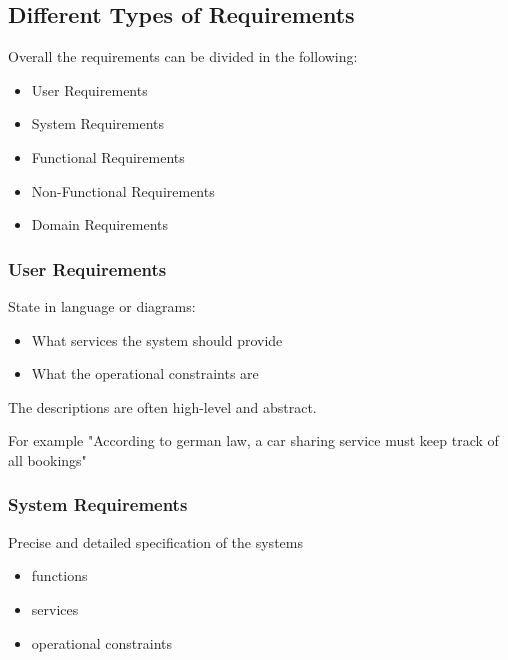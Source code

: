 \documentclass[
../../Software_Engineering_Summary.tex,
]
{subfiles}
\begin{document}
\subsection{Different Types of Requirements}
Overall the requirements can be divided in the following:

\begin{defbox*}
    \begin{itemize}
        \item User Requirements
        \item System Requirements
        \item Functional Requirements
        \item Non-Functional Requirements
        \item Domain Requirements
    \end{itemize}
\end{defbox*}

\subsubsection{User Requirements}

\begin{defbox*}
    State in language or diagrams:
    \begin{itemize}
        \item What services the system should provide
        \item What the operational constraints are
    \end{itemize}
    The descriptions are often high-level and abstract.
\end{defbox*}

For example "According to german law, a car sharing service must keep track of all bookings"

\subsubsection{System Requirements}

\begin{defbox*}
    Precise and detailed specification of the systems
    \begin{itemize}
        \item functions
        \item services 
        \item operational constraints
    \end{itemize}
\end{defbox*}
\end{document}
